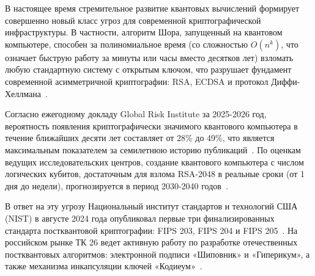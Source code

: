 \documentclass{itmo-vkr}
\begin{document}
\begin{termlist}




\end{termlist}
	
	\newpage
	
	
	В настоящее время стремительное развитие квантовых вычислений формирует совершенно новый класс угроз для современной криптографической инфраструктуры. В частности, алгоритм Шора, запущенный на квантовом компьютере, способен за полиномиальное время (со сложностью $O(n^k)$, что означает быструю работу за минуты или часы вместо десятков лет) взломать любую стандартную систему с открытым ключом, что разрушает фундамент современной асимметричной криптографии: RSA, ECDSA и протокол Диффи-Хеллмана~\cite{1994Shor}.
	
	Согласно ежегодному докладу Global Risk Institute за 2025-2026 год, вероятность появления криптографически значимого квантового компьютера в течение ближайших десяти лет составляет от 28\% до 49\%, что является максимальным показателем за семилетнюю историю публикаций~\cite{mosca2025timeline}. По оценкам ведущих исследовательских центров, создание квантового компьютера с числом логических кубитов, достаточным для взлома RSA-2048 в реальные сроки (от 1 дня до недели)\cite{gidney2025million}, прогнозируется в период 2030-2040 годов~\cite{IBMRoadmap2026}\cite{TQI_GoogleRoadmap2026}. 
	
	В ответ на эту угрозу Национальный институт стандартов и технологий США (NIST) в августе 2024 года опубликовал первые три финализированных стандарта постквантовой криптографии: FIPS 203, FIPS 204 и FIPS 205~\cite{nist-fips203}\cite{nist-fips204}\cite{nist-fips205}. На российском рынке ТК 26 ведет активную работу по разработке отечественных постквантовых алгоритмов: электронной подписи «Шиповник» и «Гиперикум», а также механизма инкапсуляции ключей «Кодиеум»~\cite{kryptonite-codiaeum}\cite{qapp-hypericum}.
	
\end{document}
